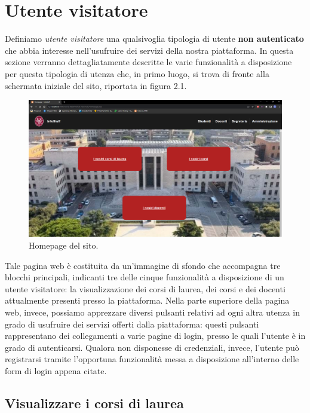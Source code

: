 \documentclass [a4paper,11pt]{book}
\begin{document}
\medskip

\section{Utente visitatore}

Definiamo \emph{utente visitatore} una qualsivoglia tipologia di utente \textbf{non autenticato} che abbia interesse nell'usufruire dei servizi della nostra piattaforma. In questa sezione verranno dettagliatamente descritte le varie funzionalità a disposizione per questa tipologia di utenza che, in primo luogo, si trova di fronte alla schermata iniziale del sito, riportata in figura 2.1. 

\begin{figure}
\centering
\includegraphics[scale=0.3]{figura2-1.png}
\caption{Homepage del sito.}
\end{figure}

Tale pagina web è costituita da un'immagine di sfondo che accompagna tre blocchi principali, indicanti tre delle cinque funzionalità a disposizione di un utente visitatore: la visualizzazione dei corsi di laurea, dei corsi e dei docenti attualmente presenti presso la piattaforma. Nella parte superiore della pagina web, invece, possiamo apprezzare diversi pulsanti relativi ad ogni altra utenza in grado di usufruire dei servizi offerti dalla piattaforma: questi pulsanti rappresentano dei collegamenti a varie pagine di login, presso le quali l'utente è in grado di autenticarsi. Qualora non disponesse di credenziali, invece, l'utente può registrarsi tramite l'opportuna funzionalità messa a disposizione all'interno delle form di login appena citate.

\medskip

\subsection{Visualizzare i corsi di laurea}
\end{document}
